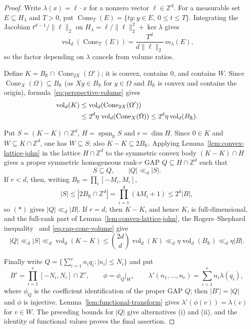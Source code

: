 \documentclass[11pt,reqno]{amsart}
\theoremstyle{definition}
\theoremstyle{remark}
\newcommand{\Z}{\mathbb Z}
\newcommand{\R}{\mathbb R}
\newcommand{\Span}{\operatorname{span}}
\newcommand{\vol}{\operatorname{vol}}
\begin{document}
\begin{proof}
Write $\lambda(x)=\ell\cdot x$ for a nonzero vector $\ell\in\Z^d$.  For
a measurable set $E\subseteq H_\lambda$ and $T>0$, put
$\operatorname{Cone}_T(E)=\{ty:y\in E,\ 0\le t\le T\}$.  Integrating the
Jacobian $t^{d-1}/\|\ell\|_2$ on
$H_\lambda=\ell/\|\ell\|_2^2+\ker\lambda$ gives
\begin{equation}
 \vol_d(\operatorname{Cone}_T(E))
 =\frac{T^d}{d\|\ell\|_2}\,m_\lambda(E),
 \label{eq:perspective-volume}
\end{equation}
so the factor depending on $\lambda$ cancels from volume ratios.

Define $K=B_{\R}\cap\operatorname{Cone}_{2X}(\Omega')$; it is convex,
contains $0$, and contains $W$.  Since
$\operatorname{Cone}_{X}(\Omega)\subseteq B_{\R}$ (as $Xy\in B_{\R}$ for
$y\in\Omega$ and $B_{\R}$ is convex and contains the origin),
formula~\eqref{eq:perspective-volume} gives
\begin{align}
 \vol_d(K)
 &\le \vol_d(\operatorname{Cone}_{2X}(\Omega'))\notag\\
 &\le 2^d\eta\,
       \vol_d(\operatorname{Cone}_{X}(\Omega))
 \le2^d\eta\vol_d(B_{\R}).
 \label{eq:cap-cone-volume}
\end{align}

Put $S=(K-K)\cap\Z^d$, $H=\Span_{\R}S$ and $r=\dim H$.  Since $0\in K$
and $W\subseteq K\cap\Z^d$, one has $W\subseteq S$; also
$K-K\subseteq2B_{\R}$.  Applying Lemma~\ref{lem:convex-lattice-john} in
the lattice $H\cap\Z^d$ to the symmetric convex body $(K-K)\cap H$ gives
a proper symmetric homogeneous rank-$r$ GAP $Q\subseteq H\cap\Z^d$ such
that
\[
 S\subseteq Q,
 \qquad
 |Q|\ll_d|S|.
 \tag{*}
\]
If $r<d$, then, writing $B_{\R}=\prod_i[-M_i,M_i]$,
\[
 |S|
 \le |2B_{\R}\cap\Z^d|
 =\prod_{i=1}^d(4M_i+1)
 \le2^d|B|,
\]
so $(*)$ gives $|Q|\ll_d|B|$.  If $r=d$, then $K-K$, and hence $K$, is
full-dimensional, and the full-rank part of
Lemma~\ref{lem:convex-lattice-john}, the Rogers--Shephard
inequality~\cite{Schneider} and \eqref{eq:cap-cone-volume} give
\[
 |Q|\ll_d|S|
 \ll_d\vol_d(K-K)
 \le \binom{2d}{d}\vol_d(K)
 \ll_d\eta\vol_d(B_{\R})
 \ll_d\eta|B|.
\]

Finally write $Q=\bigl\{\sum_{i=1}^r n_iq_i:|n_i|\le N_i\bigr\}$ and put
\[
 B'=\prod_{i=1}^r[-N_i,N_i]\cap\Z^r,
 \qquad
 \phi=\phi_Q|_W,
 \qquad
 \lambda'(n_1,\dots,n_r)=\sum_{i=1}^r n_i\lambda(q_i),
\]
where $\phi_Q$ is the coefficient identification of the proper GAP $Q$;
then $|B'|=|Q|$ and $\phi$ is injective.
Lemma~\ref{lem:functional-transform} gives
$\lambda'(\phi(v))=\lambda(v)$ for $v\in W$.  The preceding bounds for
$|Q|$ give alternatives (i) and (ii), and the identity of functional
values proves the final assertion.
\end{proof}
\end{document}
